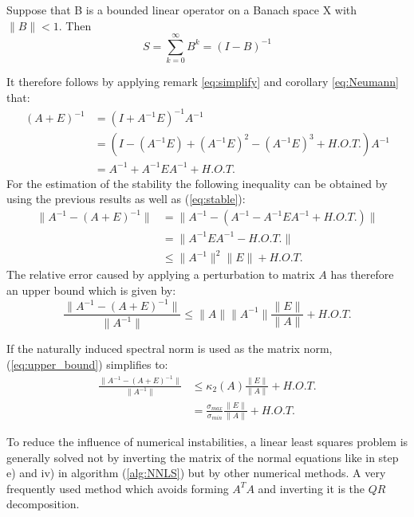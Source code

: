\begin{corollary}\label{eq:Neumann}
	Suppose that B is a bounded linear operator on a Banach space X with $\lVert B \rVert < 1$. Then	
	\begin{equation}
		S = \sum_{k=0}^\infty B^k = (I-B)^{-1}
	\end{equation}  
\end{corollary}
It therefore follows by applying remark \ref{eq:simplify} and corollary \ref{eq:Neumann} that:
\begin{align*}
	(A + E)^{-1} 	&= (I + A^{-1}E)^{-1}A^{-1} \\
					&= (I - (A^{-1}E) + (A^{-1}E)^2 - (A^{-1}E)^3 + H.O.T.) A^{-1} \\
					&= A^{-1} + A^{-1} E A^{-1} + H.O.T.
\end{align*}
 For the estimation of the stability the following inequality can be obtained by using the previous results as well as (\ref{eq:stable}):
\begin{align*}
	\lVert A^{-1} - (A + E)^{-1} \rVert & = \lVert A^{-1} - (A^{-1} - A^{-1}EA^{-1} + H.O.T.) \rVert \\
		& = \lVert A^{-1}EA^{-1} - H.O.T. \rVert \\
		& \leq \lVert A^{-1} \rVert^2 \lVert E \rVert +  H.O.T.
\end{align*}
The relative error caused by applying a perturbation to matrix $A$ has therefore an upper bound which is given by: 
\begin{equation}\label{eq:upper_bound}
 \frac{\lVert A^{-1} - (A + E)^{-1} \rVert}{\lVert A^{-1}\rVert} \leq \lVert A \rVert \lVert A^{-1} \rVert \frac{\lVert E \rVert}{\lVert A \rVert} + H.O.T.
\end{equation}

\begin{remark}
	If the naturally induced spectral norm is used as the matrix norm, (\ref{eq:upper_bound}) simplifies to:
	\begin{align*}
		\frac{\lVert A^{-1} - (A + E)^{-1} \rVert}{\lVert A^{-1}\rVert} & \leq \kappa_2(A) \frac{\lVert E \rVert}{\lVert A \rVert} + H.O.T. \\
		& = \frac{\sigma_{max}}{\sigma_{min}} \frac{\lVert E \rVert}{\lVert A \rVert} + H.O.T.
	\end{align*}
\end{remark}


To reduce the influence of numerical instabilities, a linear least squares problem is generally solved not by inverting the matrix of the normal equations like in step e) and iv) in algorithm (\ref{alg:NNLS}) but by other numerical methods. A very frequently used method which avoids forming $A^TA$ and inverting it is the $QR$ decomposition.  

